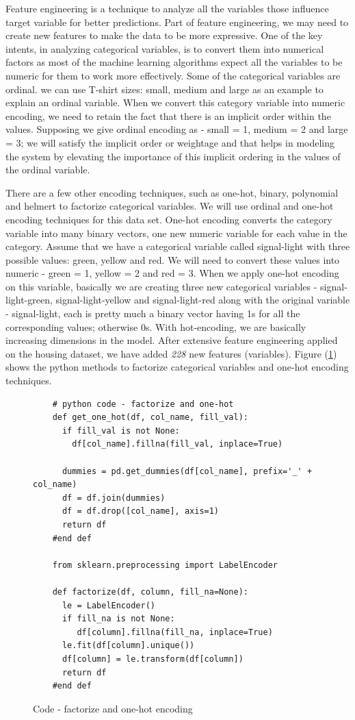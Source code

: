 \documentclass[sigconf]{acmart}
\begin{document}
	Feature engineering is a technique to analyze all the variables those influence target variable for better predictions. Part of feature engineering, we may need to create new features to make the data to be more expressive. One of the key intents, in analyzing categorical variables, is to convert them into numerical factors as most of the machine learning algorithms expect all the variables to be numeric for them to work more effectively. Some of the categorical variables are ordinal. we can use T-shirt sizes: small, medium and large as an example to explain an ordinal variable. When we convert this category variable into numeric encoding, we need to retain the fact that there is an implicit order within the values. Supposing we give ordinal encoding as - small = 1, medium = 2 and large = 3; we will satisfy the implicit order or weightage and that helps in modeling the system by elevating the importance of this implicit ordering in the values of the ordinal variable.
	
	There are a few other encoding techniques, such as one-hot, binary, polynomial and helmert to factorize categorical variables. We will use ordinal and one-hot encoding techniques for this data set. One-hot encoding converts the category variable into many binary vectors, one new numeric variable for each value in the category. Assume that we have a categorical variable called signal-light with three possible values: green, yellow and red. We will need to convert these values into numeric - green = 1, yellow = 2 and red = 3. When we apply one-hot encoding on this variable, basically we are creating three new categorical variables - signal-light-green, signal-light-yellow and signal-light-red along with the original variable - signal-light, each is pretty much a binary vector having 1s for all the corresponding values; otherwise 0s. With hot-encoding, we are basically increasing dimensions in the model. After extensive feature engineering applied on the housing dataset, we have added {\em 228} new features (variables). Figure (\ref{c:code-one-hot}) shows the python methods to factorize categorical variables and one-hot encoding techniques. 
	
	\begin{figure}[htb]	
	\begin{verbatim}	
	# python code - factorize and one-hot
	def get_one_hot(df, col_name, fill_val):
	  if fill_val is not None:
	    df[col_name].fillna(fill_val, inplace=True)
	
	  dummies = pd.get_dummies(df[col_name], prefix='_' + col_name)
	  df = df.join(dummies)
	  df = df.drop([col_name], axis=1)
	  return df
	#end def
	
	from sklearn.preprocessing import LabelEncoder
	
	def factorize(df, column, fill_na=None):
	  le = LabelEncoder()
	  if fill_na is not None:
	     df[column].fillna(fill_na, inplace=True)
	  le.fit(df[column].unique())
	  df[column] = le.transform(df[column])
	  return df
	#end def
	\end{verbatim}
	\caption{Code - factorize and one-hot encoding} \label{c:code-one-hot} 
	\end{figure}
\end{document}
